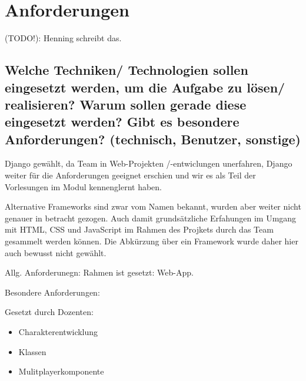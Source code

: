 
\section{Anforderungen}

(TODO!): Henning schreibt das.


\subsection{Welche Techniken/ Technologien sollen eingesetzt werden, um die Aufgabe zu lösen/ realisieren? Warum sollen gerade diese eingesetzt werden? Gibt es besondere Anforderungen? (technisch, Benutzer, sonstige)}


Django gewählt, da Team in Web-Projekten /-entwiclungen unerfahren, Django weiter für die Anforderungen geeignet erschien und wir es als Teil der Vorlesungen im Modul kennenglernt haben. 

Alternative Frameworks sind zwar vom Namen bekannt, wurden aber weiter nicht genauer in betracht gezogen. Auch damit grundsätzliche Erfahungen im Umgang mit HTML, CSS und JavaScript im Rahmen des Projkets durch das Team gesammelt werden können. Die Abkürzung über ein Framework wurde daher hier auch bewusst nicht gewählt. 




Allg. Anforderunegn:
Rahmen ist gesetzt: Web-App.



Besondere Anforderungen: 

Gesetzt durch Dozenten: 
\begin{itemize}
    \item Charakterentwicklung
    \item Klassen
    \item Mulitplayerkomponente
\end{itemize}






